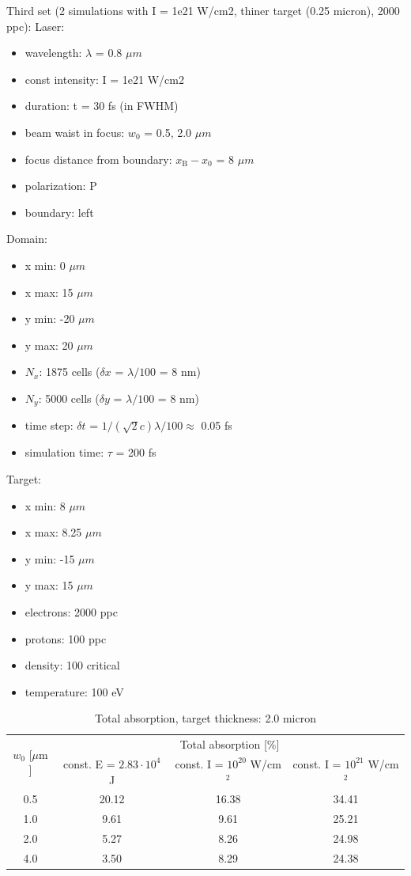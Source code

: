 \noindent
Third set (2 simulations with I = 1e21 W/cm2, thiner target (0.25 micron), 2000 ppc):
\noindent
Laser:
\begin{itemize}
	\item wavelength: $ \lambda $ = 0.8 $ \mu m $
	\item const intensity: I = 1e21 W/cm2
	\item duration: t = 30 fs (in FWHM)
	\item beam waist in focus: $ w_0 $ = 0.5, 2.0 $ \mu m $
	\item focus distance from boundary: $ x_\mathrm{B} - x_0 $ = 8 $ \mu m $
	\item polarization: P
	\item boundary: left 
\end{itemize}
Domain:
\begin{itemize}
	\item x min: 0 $ \mu m $
	\item x max: 15 $ \mu m $
	\item y min: -20 $ \mu m $
	\item y max: 20 $ \mu m $
	\item $ N_x $: 1875 cells ($ \delta x $ = $ \lambda/100 $ = 8 nm)
	\item $ N_y $: 5000 cells ($ \delta y $ = $ \lambda/100 $ = 8 nm)
	\item time step: $ \delta t $ = $ 1/(\sqrt{2} c) \lambda /100 \approx $ 0.05 fs 
	\item simulation time: $ \tau $ = 200 fs
\end{itemize}
Target:
\begin{itemize}
	\item x min: 8 $ \mu m $
	\item x max: 8.25 $ \mu m $
	\item y min: -15 $ \mu m $
	\item y max: 15 $ \mu m $
	\item electrons: 2000 ppc
	\item protons: 100 ppc
	\item density: 100 critical
	\item temperature: 100 eV
\end{itemize}

\begingroup
\renewcommand*{\arraystretch}{1.5}
\begin{table}[h!]
	\centering
	\begin{tabular}{c | c | c | c}
		\multirow{2}{*}{$ w_0 $ [$ \mu\mathrm{m} $]} & \multicolumn{3}{c}{Total absorption [\%]} \\ \cline{2-4}
		 & const. E = $ 2.83 \cdot 10^{4} $ J & const. I = $ 10^{20} $ W/cm$^2$ & const. I = $ 10^{21} $ W/cm$^2$ \\ \hline \hline
		0.5 & 20.12 & 16.38 & 34.41 \\ \hline
		1.0 & 9.61 & 9.61 & 25.21 \\ \hline
		2.0 & 5.27 & 8.26 & 24.98 \\ \hline
		4.0 & 3.50 & 8.29 & 24.38 \\
	\end{tabular}
	\caption{Total absorption, target thickness: 2.0 micron}
	\label{table:4}
\end{table}
\endgroup

